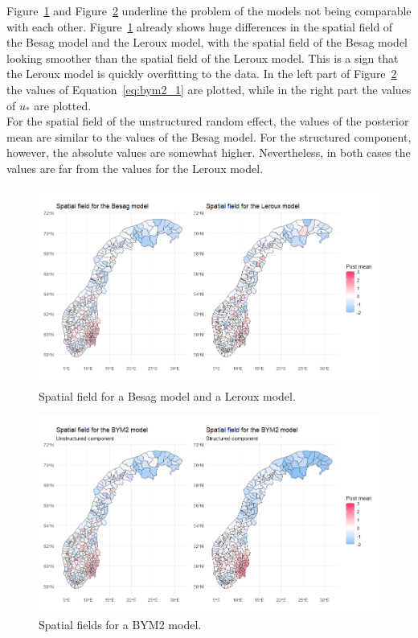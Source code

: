 Figure~\ref{comparison_norway_6} and Figure~\ref{comparison_norway_7} underline the problem of the models not being comparable with each other. Figure~\ref{comparison_norway_6} already shows huge differences in the spatial field of the Besag model and the Leroux model, with the spatial field of the Besag model looking smoother than the spatial field of the Leroux model. This is a sign that the Leroux model is quickly overfitting to the data.
In the left part of Figure~\ref{comparison_norway_7} the values of Equation~\ref{eq:bym2_1} are plotted, while in the right part the values of $u_{*}$ are plotted. \\
For the spatial field of the unstructured random effect, the values of the posterior mean are similar to the values of the Besag model. For the structured component, however, the absolute values are somewhat higher. Nevertheless, in both cases the values are far from the values for the Leroux model.
\begin{figure}[H]
  \centering
  \includegraphics[width = \textwidth]{spatial_field_norway_1.png}
  \caption{Spatial field for a Besag model and a Leroux model.}
  \label{comparison_norway_6}
\end{figure}
\begin{figure}[H]
  \centering
  \includegraphics[width = \textwidth]{spatial_field_norway_2.png}
  \caption{Spatial fields for a BYM2 model.}
  \label{comparison_norway_7}
\end{figure}
